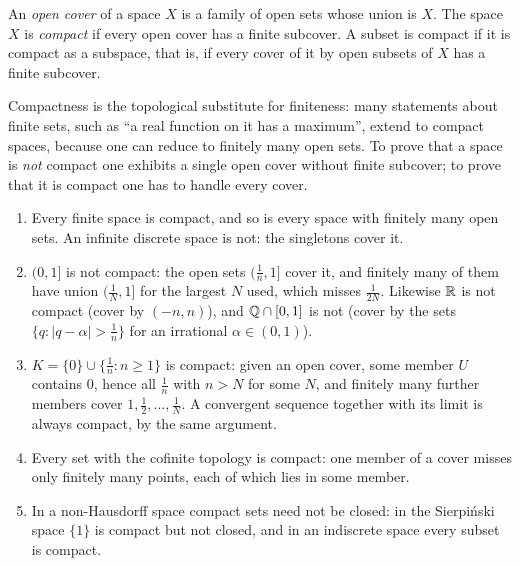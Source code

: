 \begin{definition}\label{general-topology:definition-compact}
An \emph{open cover} of a space $X$ is a family of open sets whose union is $X$. The space $X$ is \emph{compact} if every open cover has a finite
subcover. A subset is compact if it is compact as a subspace, that is, if every cover of it by open subsets of $X$ has a finite subcover.
\end{definition}

Compactness is the topological substitute for finiteness: many statements about finite sets, such as ``a real function on it has a maximum'', extend to compact spaces, because one can reduce to
finitely many open sets. To prove that a space is \emph{not} compact one exhibits a single open cover without finite subcover; to prove that it is compact one has to handle every cover.

\begin{example}\label{general-topology:example-compactness}
\begin{enumerate}
\item Every finite space is compact, and so is every space with finitely many open sets. An infinite discrete space is not: the singletons cover it.
\item $(0, 1]$ is not compact: the open sets $(\frac1n, 1]$ cover it, and finitely many of them have union $(\frac1N, 1]$ for the largest $N$ used, which misses $\frac1{2N}$. Likewise $\mathbb{R}$ is not compact
(cover by $(-n, n)$), and $\mathbb{Q} \cap [0, 1]$ is not (cover by the sets $\{q : |q - \alpha| > \frac1n\}$ for an irrational $\alpha \in (0, 1)$).
\item $K = \{0\} \cup \{\frac1n : n \geq 1\}$ is compact: given an open cover, some member $U$ contains $0$, hence all $\frac1n$ with $n > N$ for some $N$, and finitely many further members cover
$1, \frac12, \ldots, \frac1N$. A convergent sequence together with its limit is always compact, by the same argument.
\item Every set with the cofinite topology is compact: one member of a cover misses only finitely many points, each of which lies in some member.
\item In a non-Hausdorff space compact sets need not be closed: in the Sierpi\'nski space $\{1\}$ is compact but not closed, and in an indiscrete space every subset is compact.
\end{enumerate}
\end{example}

